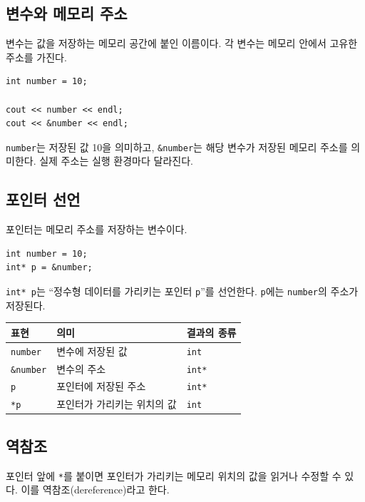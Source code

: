 \documentclass[11pt,a4paper]{article}
\begin{document}
\subsection{변수와 메모리 주소}

변수는 값을 저장하는 메모리 공간에 붙인 이름이다. 각 변수는 메모리 안에서 고유한 주소를 가진다.

\begin{lstlisting}
int number = 10;

cout << number << endl;
cout << &number << endl;
\end{lstlisting}

\texttt{number}는 저장된 값 10을 의미하고, \texttt{\&number}는 해당 변수가 저장된 메모리 주소를 의미한다. 실제 주소는 실행 환경마다 달라진다.

\subsection{포인터 선언}

포인터는 메모리 주소를 저장하는 변수이다.

\begin{lstlisting}
int number = 10;
int* p = &number;
\end{lstlisting}

\texttt{int* p}는 ``정수형 데이터를 가리키는 포인터 \texttt{p}''를 선언한다. \texttt{p}에는 \texttt{number}의 주소가 저장된다.

\begin{center}
\begin{tabular}{lll}
\toprule
표현 & 의미 & 결과의 종류 \\
\midrule
\texttt{number} & 변수에 저장된 값 & \texttt{int} \\
\texttt{\&number} & 변수의 주소 & \texttt{int*} \\
\texttt{p} & 포인터에 저장된 주소 & \texttt{int*} \\
\texttt{*p} & 포인터가 가리키는 위치의 값 & \texttt{int} \\
\bottomrule
\end{tabular}
\end{center}

\subsection{역참조}

포인터 앞에 \texttt{*}를 붙이면 포인터가 가리키는 메모리 위치의 값을 읽거나 수정할 수 있다. 이를 역참조(dereference)라고 한다.
\end{document}
